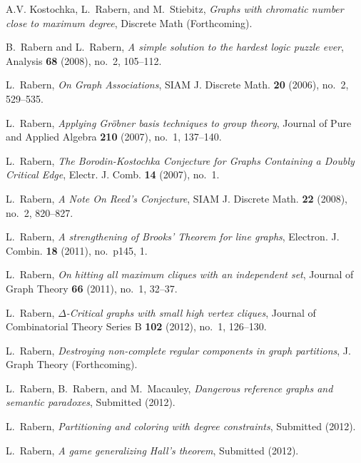 \documentclass[12pt]{amsart}
\theoremstyle{plain}
\theoremstyle{definition}
\theoremstyle{remark}
\begin{document}
\renewcommand{\refname}{Landon Rabern's Publications} 
\begin{thebibliography}{1}

A.V. Kostochka, L.~Rabern, and M.~Stiebitz, \emph{{Graphs with chromatic number
  close to maximum degree}}, Discrete Math (Forthcoming).

B.~Rabern and L.~Rabern, \emph{A simple solution to the hardest logic puzzle
  ever}, Analysis \textbf{68} (2008), no.~2, 105--112.

L.~Rabern, \emph{{On Graph Associations}}, SIAM J. Discrete Math. \textbf{20}
  (2006), no.~2, 529--535.

L.~Rabern, \emph{{Applying Gr{\"o}bner basis techniques to group theory}},
  Journal of Pure and Applied Algebra \textbf{210} (2007), no.~1, 137--140.

L.~Rabern, \emph{{The Borodin-Kostochka Conjecture for Graphs Containing a Doubly
  Critical Edge}}, Electr. J. Comb. \textbf{14} (2007), no.~1.

L.~Rabern, \emph{{A Note On Reed's Conjecture}}, SIAM J. Discrete Math.
  \textbf{22} (2008), no.~2, 820--827.

L.~Rabern, \emph{{A strengthening of Brooks' Theorem for line graphs}}, Electron.
  J. Combin. \textbf{18} (2011), no.~p145, 1.

L.~Rabern, \emph{{On hitting all maximum cliques with an independent set}},
  Journal of Graph Theory \textbf{66} (2011), no.~1, 32--37.

L.~Rabern, \emph{{$\Delta$-Critical graphs with small high vertex cliques}},
  Journal of Combinatorial Theory Series B \textbf{102} (2012), no.~1,
  126--130.

L.~Rabern, \emph{Destroying non-complete regular components in graph partitions},
  J. Graph Theory (Forthcoming).

L.~Rabern, B.~Rabern, and M.~Macauley, \emph{{Dangerous reference graphs and semantic paradoxes}}, Submitted
  (2012).

L.~Rabern, \emph{Partitioning and coloring with degree constraints}, Submitted (2012).

L.~Rabern, \emph{{A game generalizing Hall's
  theorem}}, Submitted (2012).

\end{thebibliography}
\end{document}
